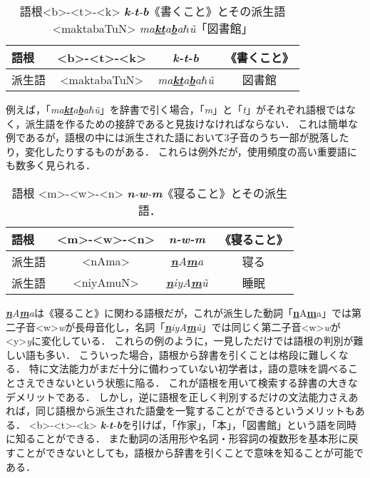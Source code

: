 \documentclass[technicalreport]{ieicej}
\begin{document}
\begin{table}[ht]
\begin{center}
\begin{tabular}{l|ccc}
   語根 & <b>-<t>-<k> &\textit{\textbf{k}-\textbf{t}-\textbf{b}}& 《書くこと》\\
  \hline
 派生語 & <maktabaTuN>&\textit{ma\underline{\textbf{k}}\underline{\textbf{t}}a\underline{\textbf{b}}a$\hbar$\~u} & 図書館\\
\hline
\end{tabular}
\caption{語根<b>-<t>-<k> \textit{\textbf{k}-\textbf{t}-\textbf{b}}《書くこと》とその派生語<maktabaTuN> \textit{ma\underline{\textbf{k}}\underline{\textbf{t}}a\underline{\textbf{b}}a$\hbar$\~u}「図書館」}
\label{table:alignment}
\end{center}
\end{table}

例えば，「\textit{ma\underline{\textbf{k}}\underline{\textbf{t}}a\underline{\textbf{b}}a$\hbar$\~u}」を辞書で引く場合，「\textit{m}」と「\textit{t}」がそれぞれ語根ではなく，派生語を作るための接辞であると見抜けなければならない．
これは簡単な例であるが，語根の中には派生された語において3子音のうち一部が脱落したり，変化したりするものがある．
これらは例外だが，使用頻度の高い重要語にも数多く見られる．

\begin{table}[ht]
\begin{center}
\begin{tabular}{l|ccc}
   語根 & <m>-<w>-<n>&\textit{\textbf{n}-\textbf{w}-\textbf{m}} & 《寝ること》\\
  \hline
 派生語& <nAma>&\textit{\underline{\textbf{n}}A\underline{\textbf{m}}a} & 寝る\footnotemark\\
  派生語& <niyAmuN>&\textit{\underline{\textbf{n}}iyA\underline{\textbf{m}}\~u} & 睡眠\\
\hline
\end{tabular}
\caption{語根 <m>-<w>-<n> \textit{\textbf{n}-\textbf{w}-\textbf{m}}《寝ること》とその派生語．}

\label{table:alignment}
\end{center}
\end{table}
\textit{\underline{\textbf{n}}A\underline{\textbf{m}}a}は《寝ること》に関わる語根だが，これが派生した動詞「{\underline{\textbf{n}}A\underline{\textbf{m}}a}」では第二子音<w>\textit{w}が長母音化し，名詞「\textit{\underline{\textbf{n}}iyA\underline{\textbf{m}}\~u}」では同じく第二子音<w>\textit{w}が<y>\textit{y}に変化している．
これらの例のように，一見しただけでは語根の判別が難しい語も多い．
こういった場合，語根から辞書を引くことは格段に難しくなる．
特に文法能力がまだ十分に備わっていない初学者は，語の意味を調べることさえできないという状態に陥る．
これが語根を用いて検索する辞書の大きなデメリットである．
しかし，逆に語根を正しく判別するだけの文法能力さえあれば，同じ語根から派生された語彙を一覧することができるというメリットもある．
<b>-<t>-<k> \textit{\textbf{k}-\textbf{t}-\textbf{b}}を引けば，「作家」，「本」，「図書館」という語を同時に知ることができる．
また動詞の活用形や名詞・形容詞の複数形を基本形に戻すことができないとしても，語根から辞書を引くことで意味を知ることが可能である．
\end{document}

